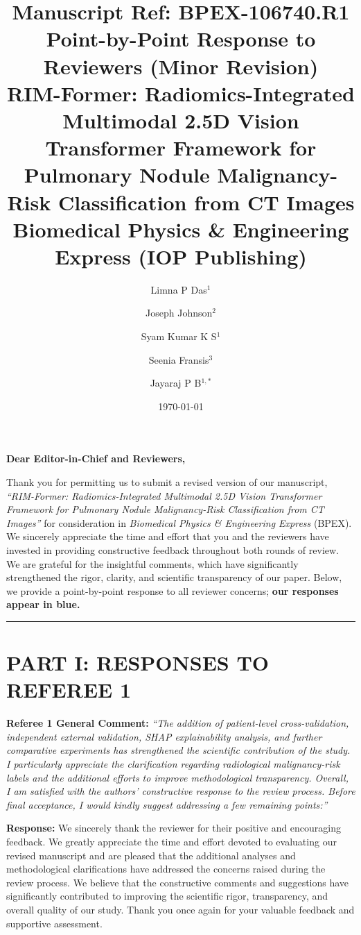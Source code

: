 \documentclass[11pt,a4paper]{article}
\title{\textbf{Manuscript Ref: BPEX-106740.R1}\\[4pt]
\textbf{Point-by-Point Response to Reviewers (Minor Revision)}\\[6pt]
\large \textbf{RIM-Former: Radiomics-Integrated Multimodal 2.5D Vision Transformer Framework for Pulmonary Nodule Malignancy-Risk Classification from CT Images}\\[6pt]
\normalsize Biomedical Physics \& Engineering Express (IOP Publishing)}
\author{Limna P Das$^1$ \and Joseph Johnson$^2$ \and Syam Kumar K S$^1$ \and Seenia Fransis$^3$ \and Jayaraj P B$^{1,*}$}
\date{\today}
\newcommand{\reviewer}[1]{{\color{reviewgray}\textit{#1}}}
\newenvironment{authorresponse}{\par\begingroup\color{authorblue}}{\endgroup\par}
\newcommand{\manuscript}[1]{\textit{``#1''}}
\begin{document}
\maketitle

\noindent\textbf{Dear Editor-in-Chief and Reviewers,}

Thank you for permitting us to submit a revised version of our manuscript, \manuscript{RIM-Former: Radiomics-Integrated Multimodal 2.5D Vision Transformer Framework for Pulmonary Nodule Malignancy-Risk Classification from CT Images} for consideration in \textit{Biomedical Physics \& Engineering Express} (BPEX). We sincerely appreciate the time and effort that you and the reviewers have invested in providing constructive feedback throughout both rounds of review. We are grateful for the insightful comments, which have significantly strengthened the rigor, clarity, and scientific transparency of our paper. Below, we provide a point-by-point response to all reviewer concerns; \textbf{\color{authorblue}our responses appear in blue.}

\vspace{1em}
\hrule
\vspace{1.5em}

\section*{PART I: RESPONSES TO REFEREE 1}

\noindent\textbf{Referee 1 General Comment:}
\reviewer{“The addition of patient-level cross-validation, independent external validation, SHAP explainability analysis, and further comparative experiments has strengthened the scientific contribution of the study. I particularly appreciate the clarification regarding radiological malignancy-risk labels and the additional efforts to improve methodological transparency. Overall, I am satisfied with the authors' constructive response to the review process. Before final acceptance, I would kindly suggest addressing a few remaining points:”}

\begin{authorresponse}
\textbf{Response:}
We sincerely thank the reviewer for their positive and encouraging feedback. We greatly appreciate the time and effort devoted to evaluating our revised manuscript and are pleased that the additional analyses and methodological clarifications have addressed the concerns raised during the review process. We believe that the constructive comments and suggestions have significantly contributed to improving the scientific rigor, transparency, and overall quality of our study. Thank you once again for your valuable feedback and supportive assessment.
\end{authorresponse}
\end{document}
